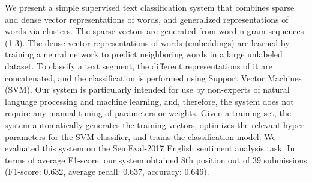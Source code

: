 We present a simple supervised text classification system that combines sparse and dense vector representations of words, and generalized representations of words via clusters. The sparse vectors are generated from word n-gram sequences (1-3). The dense vector representations of words (embeddings) are learned by training a neural network to predict neighboring words in a large unlabeled dataset. To classify a text segment, the different representations of it are concatenated, and the classification is performed using Support Vector Machines (SVM). Our system is particularly intended for use by non-experts of natural language processing and machine learning, and, therefore, the system does not require any manual tuning of parameters or weights. Given a training set, the system automatically generates the training vectors, optimizes the relevant hyper-parameters for the SVM classifier, and trains the classification model. We evaluated this system on the SemEval-2017 English sentiment analysis task. In terms of average F1-score, our system obtained 8th position out of 39 submissions (F1-score: 0.632, average recall: 0.637, accuracy: 0.646).
